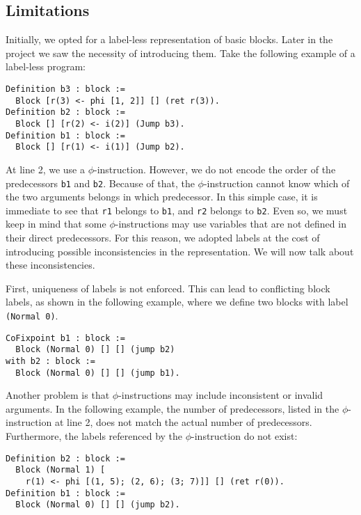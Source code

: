 \subsection{Limitations}
\label{subsec:limitations}

Initially, we opted for a label-less representation of basic blocks.
Later in the project we saw the necessity of introducing them. Take the following example of a label-less program:

\begin{lstlisting}[style=Rocq]
Definition b3 : block :=
  Block [r(3) <- phi [1, 2]] [] (ret r(3)).
Definition b2 : block :=
  Block [] [r(2) <- i(2)] (Jump b3).
Definition b1 : block :=
  Block [] [r(1) <- i(1)] (Jump b2).
\end{lstlisting}

At line 2, we use a $\phi$-instruction. However, we do not encode the order of the predecessors \texttt{b1} and \texttt{b2}. Because of that, the $\phi$-instruction cannot know which of the two arguments belongs in which predecessor. In this simple case, it is immediate to see that \texttt{r1} belongs to \texttt{b1}, and \texttt{r2} belongs to \texttt{b2}. Even so, we must keep in mind that some $\phi$-instructions may use variables that are not defined in their direct predecessors. For this reason, we adopted labels at the cost of introducing possible inconsistencies in the representation. We will now talk about these inconsistencies.

First, uniqueness of labels is not enforced. This can lead to conflicting block labels, as shown in the following example, where we define two blocks with label \texttt{(Normal 0)}.

\begin{lstlisting}[style=Rocq]
CoFixpoint b1 : block :=
  Block (Normal 0) [] [] (jump b2)
with b2 : block :=
  Block (Normal 0) [] [] (jump b1).
\end{lstlisting}

Another problem is that $\phi$-instructions may include inconsistent or invalid arguments. In the following example, the number of predecessors, listed in the $\phi$-instruction at line 2, does not match the actual number of predecessors. Furthermore, the labels referenced by the $\phi$-instruction do not exist:

\begin{lstlisting}[style=Rocq]
Definition b2 : block :=
  Block (Normal 1) [
    r(1) <- phi [(1, 5); (2, 6); (3; 7)]] [] (ret r(0)).
Definition b1 : block :=
  Block (Normal 0) [] [] (jump b2).
\end{lstlisting}

